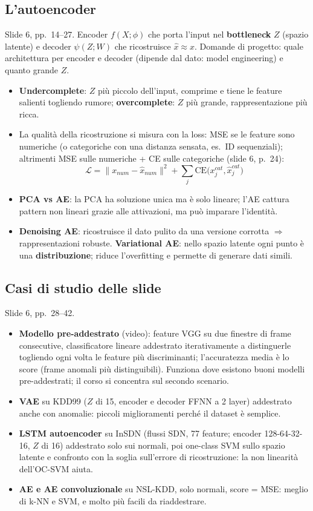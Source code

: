 \subsection{L'autoencoder}
Slide 6, pp.\ 14--27. Encoder $f(X;\phi)$ che porta l'input nel \textbf{bottleneck} $Z$ (spazio latente) e decoder $\psi(Z;W)$ che ricostruisce
$\hat x \approx x$. Domande di progetto: quale architettura per encoder e decoder (dipende dal dato: model engineering) e quanto grande $Z$.
\begin{itemize}
  \item \textbf{Undercomplete}: $Z$ più piccolo dell'input, comprime e tiene le feature salienti togliendo rumore; \textbf{overcomplete}: $Z$
        più grande, rappresentazione più ricca.
  \item La qualità della ricostruzione si misura con la loss: MSE se le feature sono numeriche (o categoriche con una distanza sensata, es.\ ID
        sequenziali); altrimenti MSE sulle numeriche + CE sulle categoriche (slide 6, p.~24):
        \[
        \mathcal{L} = \lVert x_{num} - \hat x_{num}\rVert^2 + \sum_{j} \mathrm{CE}\big(x^{cat}_j, \hat x^{cat}_j\big)
        \]
  \item \textbf{PCA vs AE}: la PCA ha soluzione unica ma è solo lineare; l'AE cattura pattern non lineari grazie alle attivazioni, ma
        può imparare l'identità.
  \item \textbf{Denoising AE}: ricostruisce il dato pulito da una versione corrotta $\Rightarrow$ rappresentazioni robuste.
        \textbf{Variational AE}: nello spazio latente ogni punto è una \textbf{distribuzione}; riduce l'overfitting e permette di generare
        dati simili.
\end{itemize}

\subsection{Casi di studio delle slide}
Slide 6, pp.\ 28--42.
\begin{itemize}
  \item \textbf{Modello pre-addestrato} (video): feature VGG su due finestre di frame consecutive, classificatore lineare addestrato
        iterativamente a distinguerle togliendo ogni volta le feature più discriminanti; l'accuratezza media è lo score (frame anomali più
        distinguibili). Funziona dove esistono buoni modelli pre-addestrati; il corso si concentra sul secondo scenario.
  \item \textbf{VAE} su KDD99 ($Z$ di 15, encoder e decoder FFNN a 2 layer) addestrato anche con anomalie: piccoli miglioramenti perché il
        dataset è semplice.
  \item \textbf{LSTM autoencoder} su InSDN (flussi SDN, 77 feature; encoder 128-64-32-16, $Z$ di 16) addestrato solo sui normali, poi
        one-class SVM sullo spazio latente e confronto con la soglia sull'errore di ricostruzione: la non linearità dell'OC-SVM aiuta.
  \item \textbf{AE e AE convoluzionale} su NSL-KDD, solo normali, score = MSE: meglio di k-NN e SVM, e molto più facili da riaddestrare.
\end{itemize}

